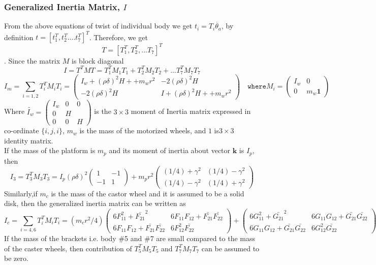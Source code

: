 \subsubsection*{Generalized Inertia Matrix, $I$}
 From the above equations of twist of individual body we get  $t_i=T_i\dot{\theta_a}$, by definition  $t=[t_1^T, t_2^T....t_7^T]^T$. Therefore, we get  \[T=[T_1^T, T_2^T,... T_7]^T\]. Since the matrix $M$ is block diagonal
\begin{equation}
I=T^TMT=T_1^TM_1T_1+T_2^TM_2T_2+...T_7^TM_7T_7
\end{equation}
\begin{equation}
I_m=\sum_{i=1,2}T_i^TM_iT_i=\begin{pmatrix}
I_w+(\rho\delta)^2H++m_wr^2 & -2(\rho\delta)^2H
\\
-2(\rho\delta)^2H &I+(\rho\delta)^2H++m_wr^2
\end{pmatrix} \quad \mathtt{ where} M_i=\begin{pmatrix}
I_w &0\\0 & m_w\mathbf{1}
\end{pmatrix}
\end{equation}
Where $\tilde{I_w}=\begin{pmatrix}
I_w&0&0\\0&H&\\0&0&H
\end{pmatrix}$ is the $3\times 3$ moment of Inertia matrix expressed in co-ordinate $\{i,j,i\}$, $m_w$ is the mass of the motorized wheels, and $1$ is$3\times 3$ identity matrix.
\\
If the mass of the platform is $m_p$ and its moment of inertia about vector $\mathbf{k}$ is $I_p$, then \cite{angeles2013fundamentals} 
\begin{equation}
I_3=T^T_3M_3T_3=I_p(\rho\delta)^2\begin{pmatrix}
1&-1\\-1&1
\end{pmatrix}
+m_pr^2\begin{pmatrix}
(1/4)+\gamma^2 & (1/4)-\gamma^2\\(1/4)-\gamma^2 & (1/4)+\gamma^2
\end{pmatrix}
\end{equation}
Similarly,if $m_c$ is the mass of the castor wheel and it is assumed to be a solid disk, then the generalized inertia matrix  can be written as
\begin{equation}
I_c=\sum_{i=4,6}T^T_iM_iT_i=(m_cr^2/4)
\begin{pmatrix}
6F_{11}^2+\bar{F_{21}}^2 & 6F_{11}F_{12}+\bar{F_{21}}\bar{F_{22}}\\
6F_{11}F_{12}+\bar{F_{21}}\bar{F_{22}} & 6F_{12}^2\bar{F_22}
\end{pmatrix}+\begin{pmatrix}
6G_{11}^2+\bar{G_{21}}^2 & 6G_{11}G_{12}+\bar{G_{21}}\bar{G_{22}}\\
6G_{11}G_{12}+\bar{G_{21}}\bar{G_{22}} & 6G_{12}^2\bar{G_22}
\end{pmatrix}
\end{equation}
If the mass of the brackets i.e. body \#5 and \#7 are small compared to the mass of the caster wheels, then contribution of $T^T_5M_5T_5$ and $T^T_7M_7T_7$ can be assumed to be zero.


